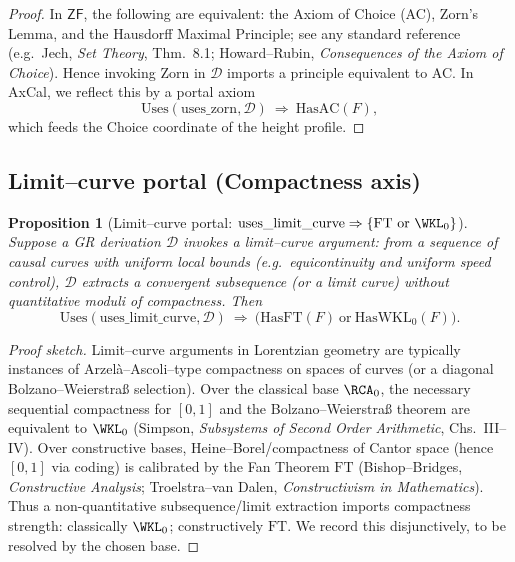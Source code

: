 \documentclass[11pt]{article}
\newtheorem{proposition}[theorem]{Proposition}
\theoremstyle{definition}
\theoremstyle{remark}
\newcommand{\ZF}{\mathsf{ZF}}
\newcommand{\FT}{\mathrm{FT}}
\begin{document}
\begin{proof}
In $\ZF$, the following are equivalent: the Axiom of Choice (AC), Zorn's Lemma, and the Hausdorff Maximal Principle; see any standard reference (e.g.\ Jech, \emph{Set Theory}, Thm.~8.1; Howard–Rubin, \emph{Consequences of the Axiom of Choice}). Hence invoking Zorn in $\mathcal{D}$ imports a principle equivalent to AC. In AxCal, we reflect this by a portal axiom
\[
\mathrm{Uses}(\mathrm{uses\_zorn},\mathcal{D})\ \Rightarrow\ \mathrm{HasAC}(F),
\]
which feeds the Choice coordinate of the height profile. \qedhere
\end{proof}

\subsection{Limit–curve portal (Compactness axis)}

\begin{proposition}[Limit–curve portal: $\mathrm{uses\_limit\_curve}\Rightarrow\{\FT\ \text{or}\ \WKL_0\}$]
\label{prop:limit-curve-portal}
Suppose a GR derivation $\mathcal{D}$ invokes a \emph{limit–curve} argument: from a sequence of causal curves with uniform local bounds (e.g.\ equicontinuity and uniform speed control), $\mathcal{D}$ extracts a convergent subsequence (or a limit curve) without quantitative moduli of compactness. Then
\[
\mathrm{Uses}(\mathrm{uses\_limit\_curve},\mathcal{D}) \ \Rightarrow\ \big(\mathrm{HasFT}(F)\ \text{or}\ \mathrm{HasWKL}_0(F)\big).
\]
\end{proposition}

\begin{proof}[Proof sketch]
Limit–curve arguments in Lorentzian geometry are typically instances of Arzelà–Ascoli–type compactness on spaces of curves (or a diagonal Bolzano–Weierstraß selection). Over the classical base $\RCA_0$, the necessary sequential compactness for $[0,1]$ and the Bolzano–Weierstraß theorem are equivalent to $\WKL_0$ (Simpson, \emph{Subsystems of Second Order Arithmetic}, Chs.~III–IV). Over constructive bases, Heine–Borel/compactness of Cantor space (hence $[0,1]$ via coding) is calibrated by the Fan Theorem $\FT$ (Bishop–Bridges, \emph{Constructive Analysis}; Troelstra–van Dalen, \emph{Constructivism in Mathematics}). Thus a non-quantitative subsequence/limit extraction imports compactness strength: classically $\WKL_0$; constructively $\FT$. We record this disjunctively, to be resolved by the chosen base. \qedhere
\end{proof}
\end{document}
